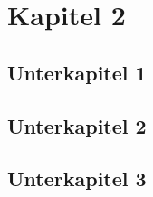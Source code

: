 \chapter{Kapitel 2}
\blindtext

\section{Unterkapitel 1}
\blindtext

\section{Unterkapitel 2}
\blindtext

\section{Unterkapitel 3}
\blindtext